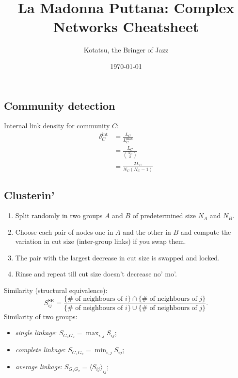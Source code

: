 \documentclass[a4paper,9pt]{extarticle}
\title{La Madonna Puttana: Complex Networks Cheatsheet}
\author{\usym{1F3BC}\;Kotatsu, the Bringer of Jazz\;\usym{1F3B9}}
\date{\today}
\begin{document}
	
	\maketitle
	
	\begin{multicols*}{2}
	\section{Community detection}
	Internal link density for community $C$:
	\begin{align*}
		\delta^{\mathrm{int}}_{C}&=\frac{L_{C}}{L_{C}^{\max}}\\
		&=\frac{L_{C}}{{N_{C}\choose 2}}\\
		&=\frac{2L_{C}}{N_{C}(N_{C}-1)}
	\end{align*}
		\subsection{Clusterin'}
		\begin{riquadro}
			\begin{enumerate}
				\item Split randomly in two groups $A$ and $B$ of predetermined size $N_{A}$ and $N_{B}$.\\
				\item Choose each pair of nodes one in $A$ and the other in $B$ and compute the variation in cut size (inter-group links) if you swap them.
				\item The pair with the largest decrease in cut size is swapped and locked.
				\item Rinse and repeat till cut size doesn't decrease no' mo'.
			\end{enumerate}
		\end{riquadro}
		Similarity (structural equivalence):
		\begin{equation*}
			S^{\text{SE}}_{ij}=\frac{\{\text{$\#$ of neighbours of $i$}\}\cap\{\text{$\#$ of neighbours of $j$}\}}{\{\text{$\#$ of neighbours of $i$}\}\cup\{\text{$\#$ of neighbours of $j$}\}}.
		\end{equation*}
		Similarity of two groups:
		\begin{itemize}
			\item \textit{single linkage}: $S_{G_{1}G_{2}}=\max_{i,j}S_{ij}$;
			\item \textit{complete linkage}: $S_{G_{1}G_{2}}=\min_{i,j}S_{ij}$;
			\item \textit{average linkage}: $S_{G_{1}G_{2}}={\langle S_{ij}\rangle}_{ij}$;
		\end{itemize}

\end{multicols*}
\end{document}
